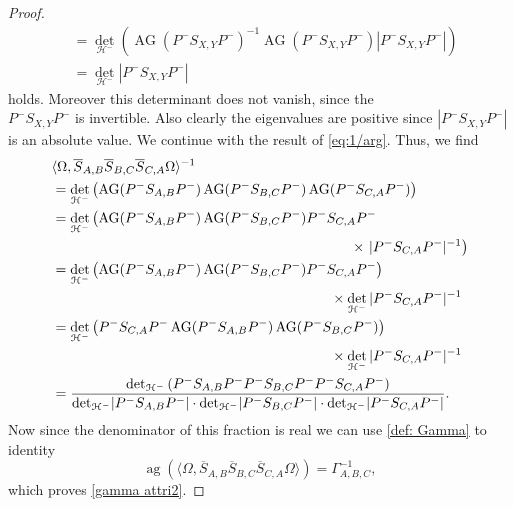 \documentclass[b5paper,draft,openbib,12pt]{memoir}
\DeclareMathOperator{\ag}{ag}
\DeclareMathOperator{\AG}{AG}
\begin{document}
\begin{proof}
\begin{align}
&=\det_{\mathcal{H}^-} \left(\AG(P^- S_{X,Y}P^-)^{-1} \AG(P^- S_{X,Y}P^-) |P^- S_{X,Y} P^-| \right)\\
&=\det_{\mathcal{H}^-} |P^- S_{X,Y}P^-|
\end{align}
holds. Moreover this determinant does not vanish, since the\\ \(P^- S_{X,Y}P^-\) is invertible. Also clearly the eigenvalues are positive
since \(|P^- S_{X,Y}P^-|\) is an absolute value. We continue with the result of \eqref{eq:1/arg}. Thus, we find
\begin{align}\label{eq: arg representation}
&\langle \Omega, \overline{S}_{A,B} \overline{S}_{B,C} \overline{S}_{C,A}\Omega\rangle^{-1}\\
&=\det_{\mathcal{H}^-}\left(  \AG(P^- S_{A,B} P^-) \AG(P^- S_{B,C} P^-) \AG(P^-S_{C,A} P^-)  \right)\\\notag
&=\det_{\mathcal{H}^-}\left(  \AG(P^- S_{A,B} P^-) \AG(P^- S_{B,C} P^-) P^-S_{C,A} P^-\right.\\
&\hspace{7.5cm}\times\left. |P^-S_{C,A} P^-|^{-1}  \right)\\\notag
&=\det_{\mathcal{H}^-}\left(  \AG(P^- S_{A,B} P^-) \AG(P^- S_{B,C} P^-) P^-S_{C,A} P^-  \right)\\
&\hspace{7cm}\times \det_{\mathcal{H}^-}|P^-S_{C,A} P^-|^{-1} \\\notag
&=\det_{\mathcal{H}^-}\left( P^-S_{C,A} P^- \AG(P^- S_{A,B} P^-) \AG(P^- S_{B,C} P^-)  \right)\\
&\hspace{7cm}\times \det_{\mathcal{H}^-}|P^-S_{C,A} P^-|^{-1} \\
&=\frac{\det_{\mathcal{H}^-}\left(P^- S_{A,B} P^- P^- S_{B,C} P^- P^-S_{C,A} P^-  \right)}
{\det_{\mathcal{H}^-}\!|P^- S_{A,B} P^-| \cdot \det_{\mathcal{H}^-}\!|P^-S_{B,C} P^-|\cdot \det_{\mathcal{H}^-}\!|P^-S_{C,A} P^-|}.
\end{align}
Now since the denominator of this fraction is real we can use \eqref{def: Gamma} to identity
\begin{equation}
\ag(\langle \Omega, \overline{S}_{A,B} \overline{S}_{B,C} \overline{S}_{C,A}\Omega\rangle)=\Gamma_{A,B,C}^{-1},
\end{equation}
which proves \eqref{gamma attri2}.


\end{proof}
\end{document}
